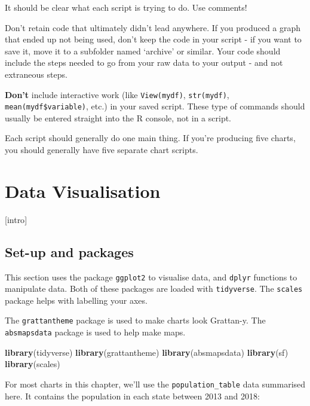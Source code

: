 \documentclass[]{book}
\newenvironment{Shaded}{\begin{snugshade}}{\end{snugshade}}
\newcommand{\KeywordTok}[1]{\textcolor[rgb]{0.13,0.29,0.53}{\textbf{#1}}}
\newcommand{\NormalTok}[1]{#1}
\begin{document}
It should be clear what each script is trying to do. Use comments!

Don't retain code that ultimately didn't lead anywhere. If you produced a graph that ended up not being used, don't keep the code in your script - if you want to save it, move it to a subfolder named `archive' or similar. Your code should include the steps needed to go from your raw data to your output - and not extraneous steps.

\textbf{Don't} include interactive work (like \texttt{View(mydf)}, \texttt{str(mydf)}, \texttt{mean(mydf\$variable)}, etc.) in your saved script. These type of commands should usually be entered straight into the R console, not in a script.

Each script should generally do one main thing. If you're producing five charts, you should generally have five separate chart scripts.

\hypertarget{data-visualisation}{%
\chapter{Data Visualisation}\label{data-visualisation}}

{[}intro{]}

\hypertarget{set-up-and-packages}{%
\section{Set-up and packages}\label{set-up-and-packages}}

This section uses the package \texttt{ggplot2} to visualise data, and \texttt{dplyr} functions to manipulate data. Both of these packages are loaded with \texttt{tidyverse}. The \texttt{scales} package helps with labelling your axes.

The \texttt{grattantheme} package is used to make charts look Grattan-y. The \texttt{absmapsdata} package is used to help make maps.

\begin{Shaded}
\begin{Highlighting}[]
\KeywordTok{library}\NormalTok{(tidyverse)}
\KeywordTok{library}\NormalTok{(grattantheme)}
\KeywordTok{library}\NormalTok{(absmapsdata)}
\KeywordTok{library}\NormalTok{(sf)}
\KeywordTok{library}\NormalTok{(scales)}
\end{Highlighting}
\end{Shaded}

For most charts in this chapter, we'll use the \texttt{population\_table} data summarised here. It contains the population in each state between 2013 and 2018:
\end{document}
